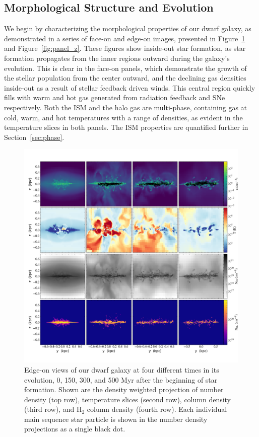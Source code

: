\documentclass[twocolumn]{aastex61}
\begin{document}
\subsection{Morphological Structure and Evolution}
\label{sec:structure}

We begin by characterizing the morphological properties of our dwarf galaxy, as demonstrated in a series of face-on and edge-on images, presented in Figure~\ref{fig:panel_x} and Figure~\ref{fig:panel_z}. These figures show inside-out star formation, as star formation propagates from the inner regions outward during the galaxy's evolution. This is clear in the face-on panels, which demonstrate the growth of the stellar population from the center outward, and the declining gas densities inside-out as a result of stellar feedback driven winds. This central region quickly fills with warm and hot gas generated from radiation feedback and SNe respectively. Both the ISM and the halo gas are multi-phase, containing gas at cold, warm, and hot temperatures with a range of densities, as evident in the temperature slices in both panels. The ISM properties are quantified further in Section~\ref{sec:phase}.

\begin{figure}
\centering
\includegraphics[width=0.975\linewidth]{multiplot_4x4_x.png}
\caption{Edge-on views of our dwarf galaxy at four different times in its evolution, 0, 150, 300, and 500 Myr after the beginning of star formation. Shown are the density weighted projection of number density (top row), temperature slices (second row),  column density (third row), and H$_2$ column density (fourth row). Each individual main sequence star particle is shown in the number density projections as a single black dot.}
\label{fig:panel_x}
\end{figure}
\end{document}
